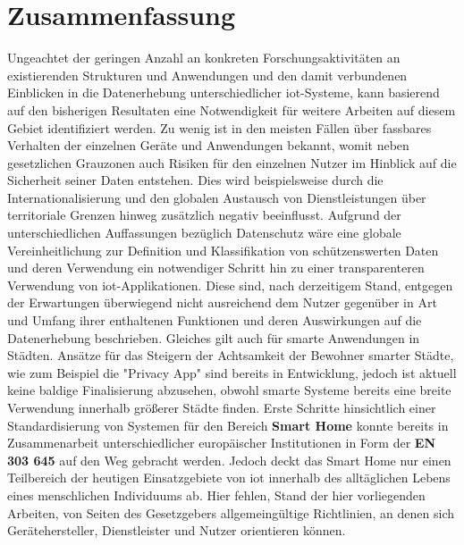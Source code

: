 
\section{Zusammenfassung}
\label{sec:Zusammenfassung}
Ungeachtet der geringen Anzahl an konkreten Forschungsaktivitäten an existierenden Strukturen und Anwendungen und den damit verbundenen Einblicken in die Datenerhebung unterschiedlicher \ac{iot}-Systeme, kann basierend auf den bisherigen Resultaten eine Notwendigkeit für weitere Arbeiten auf diesem Gebiet identifiziert werden. Zu wenig ist in den meisten Fällen über fassbares Verhalten der einzelnen Geräte und Anwendungen bekannt, womit neben gesetzlichen Grauzonen auch Risiken für den einzelnen Nutzer im Hinblick auf die Sicherheit seiner Daten entstehen. Dies wird beispielsweise durch die Internationalisierung und den globalen Austausch von Dienstleistungen über territoriale Grenzen hinweg zusätzlich negativ beeinflusst. Aufgrund der unterschiedlichen Auffassungen bezüglich Datenschutz wäre eine globale Vereinheitlichung zur Definition und Klassifikation von schützenswerten Daten und deren Verwendung ein notwendiger Schritt hin zu einer transparenteren Verwendung von \ac{iot}-Applikationen.
Diese sind, nach derzeitigem Stand, entgegen der Erwartungen überwiegend nicht ausreichend dem Nutzer gegenüber in Art und Umfang ihrer enthaltenen Funktionen und deren Auswirkungen auf die Datenerhebung beschrieben. Gleiches gilt auch für smarte Anwendungen in Städten. Ansätze für das Steigern der Achtsamkeit der Bewohner smarter Städte, wie zum Beispiel die "Privacy App" \cite{EUIOTGDPR} sind bereits in Entwicklung, jedoch ist aktuell keine baldige Finalisierung abzusehen, obwohl smarte Systeme bereits eine breite Verwendung innerhalb größerer Städte finden.
Erste Schritte hinsichtlich einer Standardisierung von Systemen für den Bereich \textbf{Smart Home} konnte bereits in Zusammenarbeit unterschiedlicher europäischer Institutionen in Form der \textbf{EN 303 645} \cite{ETSI2020} auf den Weg gebracht werden. Jedoch deckt das Smart Home nur einen Teilbereich der heutigen Einsatzgebiete von \ac{iot} innerhalb des alltäglichen Lebens eines menschlichen Individuums ab. Hier fehlen, Stand der hier vorliegenden Arbeiten, von Seiten des Gesetzgebers allgemeingültige Richtlinien, an denen sich Gerätehersteller, Dienstleister und Nutzer orientieren können.
